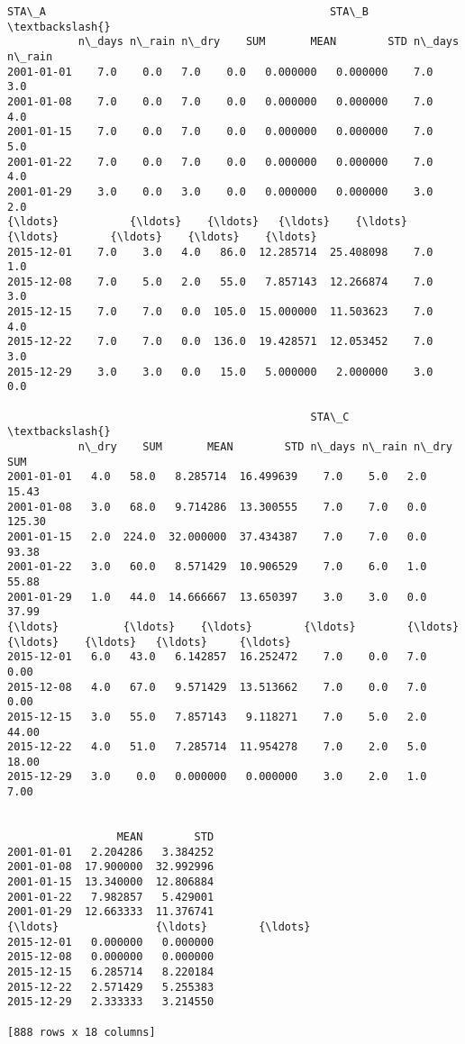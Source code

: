 \documentclass[11pt]{article}
\makeatletter
\newcommand{\boxspacing}{\kern\kvtcb@left@rule\kern\kvtcb@boxsep}
\newcommand{\prompt}[4]{
        {\ttfamily\llap{{\color{#2}[#3]:\hspace{3pt}#4}}\vspace{-\baselineskip}}
    }
\makeatother
\begin{document}
            \begin{tcolorbox}[breakable, size=fbox, boxrule=.5pt, pad at break*=1mm, opacityfill=0]
\prompt{Out}{outcolor}{ }{\boxspacing}
\begin{Verbatim}[commandchars=\\\{\}]
            STA\_A                                            STA\_B         \textbackslash{}
           n\_days n\_rain n\_dry    SUM       MEAN        STD n\_days n\_rain
2001-01-01    7.0    0.0   7.0    0.0   0.000000   0.000000    7.0    3.0
2001-01-08    7.0    0.0   7.0    0.0   0.000000   0.000000    7.0    4.0
2001-01-15    7.0    0.0   7.0    0.0   0.000000   0.000000    7.0    5.0
2001-01-22    7.0    0.0   7.0    0.0   0.000000   0.000000    7.0    4.0
2001-01-29    3.0    0.0   3.0    0.0   0.000000   0.000000    3.0    2.0
{\ldots}           {\ldots}    {\ldots}   {\ldots}    {\ldots}        {\ldots}        {\ldots}    {\ldots}    {\ldots}
2015-12-01    7.0    3.0   4.0   86.0  12.285714  25.408098    7.0    1.0
2015-12-08    7.0    5.0   2.0   55.0   7.857143  12.266874    7.0    3.0
2015-12-15    7.0    7.0   0.0  105.0  15.000000  11.503623    7.0    4.0
2015-12-22    7.0    7.0   0.0  136.0  19.428571  12.053452    7.0    3.0
2015-12-29    3.0    3.0   0.0   15.0   5.000000   2.000000    3.0    0.0

                                               STA\_C                       \textbackslash{}
           n\_dry    SUM       MEAN        STD n\_days n\_rain n\_dry     SUM
2001-01-01   4.0   58.0   8.285714  16.499639    7.0    5.0   2.0   15.43
2001-01-08   3.0   68.0   9.714286  13.300555    7.0    7.0   0.0  125.30
2001-01-15   2.0  224.0  32.000000  37.434387    7.0    7.0   0.0   93.38
2001-01-22   3.0   60.0   8.571429  10.906529    7.0    6.0   1.0   55.88
2001-01-29   1.0   44.0  14.666667  13.650397    3.0    3.0   0.0   37.99
{\ldots}          {\ldots}    {\ldots}        {\ldots}        {\ldots}    {\ldots}    {\ldots}   {\ldots}     {\ldots}
2015-12-01   6.0   43.0   6.142857  16.252472    7.0    0.0   7.0    0.00
2015-12-08   4.0   67.0   9.571429  13.513662    7.0    0.0   7.0    0.00
2015-12-15   3.0   55.0   7.857143   9.118271    7.0    5.0   2.0   44.00
2015-12-22   4.0   51.0   7.285714  11.954278    7.0    2.0   5.0   18.00
2015-12-29   3.0    0.0   0.000000   0.000000    3.0    2.0   1.0    7.00


                 MEAN        STD
2001-01-01   2.204286   3.384252
2001-01-08  17.900000  32.992996
2001-01-15  13.340000  12.806884
2001-01-22   7.982857   5.429001
2001-01-29  12.663333  11.376741
{\ldots}               {\ldots}        {\ldots}
2015-12-01   0.000000   0.000000
2015-12-08   0.000000   0.000000
2015-12-15   6.285714   8.220184
2015-12-22   2.571429   5.255383
2015-12-29   2.333333   3.214550

[888 rows x 18 columns]
\end{Verbatim}
\end{tcolorbox}
        
\end{document}
